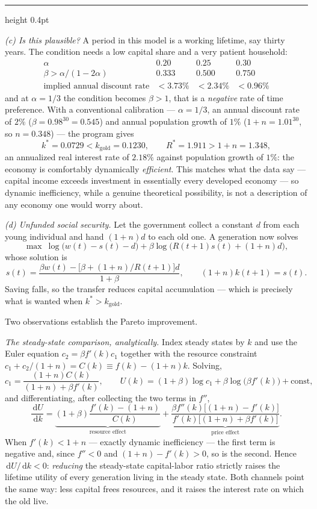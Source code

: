 \documentclass[11pt,letterpaper,reqno]{amsart}
\makeatletter
\newcommand{\dd}{\,\mathrm{d}}
\newcommand{\as@head}[3]{%
  \par\addvspace{1.6ex}\penalty-200\relax
  \phantomsection
  \addcontentsline{toc}{subsection}{#1 #2\texorpdfstring{\ifx\relax#3\relax\else\quad #3\fi}{}}%
  {\color{RuleGrey}\hrule height 0.4pt}%
  \nobreak\vspace{0.8ex}\nobreak
  \noindent{\bfseries #1 #2}%
  \ifx\relax#3\relax\else\quad{\bfseries\itshape #3}\fi
  \par\nobreak\vspace{0.4ex}\nobreak
  \as@beginstatement
}
\newcommand{\as@beginstatement}{\begingroup\itshape\ignorespaces}
\newenvironment{aex}[2]{\as@head{Exercise}{#1}{#2}}{\par\addvspace{1.2ex}}
\renewcommand{\as@beginstatement}{\ignorespaces}
\makeatother
\begin{document}
\begin{aex}{9.9}{}
\emph{(c) Is this plausible?}  A period in this model is a working lifetime, say thirty years.
The condition needs a low capital share and a very patient household:
\[
\begin{array}{cccc}
\alpha & 0.20 & 0.25 & 0.30 \\
\beta>\alpha/(1-2\alpha) & 0.333 & 0.500 & 0.750 \\
\text{implied annual discount rate} & <3.73\% & <2.34\% & <0.96\%
\end{array}
\]
and at $\alpha=1/3$ the condition becomes $\beta>1$, that is a \emph{negative} rate of time
preference.  With a conventional calibration --- $\alpha=1/3$, an annual discount rate of $2\%$
($\beta=0.98^{30}=0.545$) and annual population growth of $1\%$ ($1+n=1.01^{30}$, so $n=0.348$)
--- the program gives
\[
k^{*}=0.0729<k_{\text{gold}}=0.1230,
\qquad
R^{*}=1.911>1+n=1.348 ,
\]
an annualized real interest rate of $2.18\%$ against population growth of $1\%$: the economy is
comfortably dynamically \emph{efficient}.  This matches what the data say --- capital income
exceeds investment in essentially every developed economy --- so dynamic inefficiency, while a
genuine theoretical possibility, is not a description of any economy one would worry about.

\emph{(d) Unfunded social security.}  Let the government collect a constant $d$ from each young
individual and hand $(1+n)d$ to each old one.  A generation now solves
\[
\max\ \log\bigl(w(t)-s(t)-d\bigr)+\beta\log\bigl(R(t+1)s(t)+(1+n)d\bigr),
\]
whose solution is
\[
s(t)=\frac{\beta w(t)-\bigl[\beta+(1+n)/R(t+1)\bigr]d}{1+\beta},
\qquad
(1+n)k(t+1)=s(t).
\tag{$\dagger$}
\]
Saving falls, so the transfer reduces capital accumulation --- which is precisely what is wanted
when $k^{*}>k_{\text{gold}}$.

Two observations establish the Pareto improvement.

\emph{The steady-state comparison, analytically.}  Index steady states by $k$ and use the Euler
equation $c_2=\beta f'(k)c_1$ together with the resource constraint
$c_1+c_2/(1+n)=C(k)\equiv f(k)-(1+n)k$.  Solving,
\[
c_1=\frac{(1+n)C(k)}{(1+n)+\beta f'(k)},
\qquad
U(k)=(1+\beta)\log c_1+\beta\log\bigl(\beta f'(k)\bigr)+\text{const},
\]
and differentiating, after collecting the two terms in $f''$,
\[
\frac{\dd U}{\dd k}
=\underbrace{(1+\beta)\frac{f'(k)-(1+n)}{C(k)}}_{\text{resource effect}}
+\underbrace{\frac{\beta f''(k)\bigl[(1+n)-f'(k)\bigr]}{f'(k)\bigl[(1+n)+\beta f'(k)\bigr]}}_{\text{price effect}} .
\]
When $f'(k)<1+n$ --- exactly dynamic inefficiency --- the first term is negative and, since
$f''<0$ and $(1+n)-f'(k)>0$, so is the second.  Hence $\dd U/\dd k<0$: \emph{reducing} the
steady-state capital-labor ratio strictly raises the lifetime utility of every generation living
in the steady state.  Both channels point the same way: less capital frees resources, and it
raises the interest rate on which the old live.


\end{aex}
\end{document}

